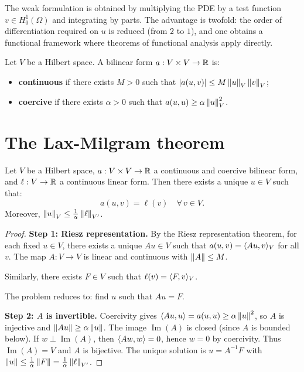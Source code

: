 \begin{intuition}
The weak formulation is obtained by multiplying the PDE by a test function
$v \in H_0^1(\Omega)$ and integrating by parts. The advantage is twofold: the
order of differentiation required on $u$ is reduced (from $2$ to $1$), and one
obtains a functional framework where theorems of functional analysis apply
directly.
\end{intuition}

\begin{definition}
Let $V$ be a Hilbert space. A bilinear form $a : V \times V \to \mathbb{R}$ is:
\begin{itemize}
    \item \textbf{continuous} if there exists $M > 0$ such that $\left| a(u,v) \right| \leq M\left\| u \right\|_V \left\| v \right\|_V$;
    \item \textbf{coercive} if there exists $\alpha > 0$ such that $a(u,u) \geq \alpha \left\| u \right\|_V^2$.
\end{itemize}
\end{definition}

\section{The Lax-Milgram theorem}

\begin{theorem}
\label{thm:lax_milgram}
Let $V$ be a Hilbert space, $a : V \times V \to \mathbb{R}$ a continuous and coercive
bilinear form, and $\ell : V \to \mathbb{R}$ a continuous linear form. Then there exists a
unique $u \in V$ such that:
\[
    a(u, v) = \ell(v) \quad \forall\, v \in V.
\]
Moreover, $\left\| u \right\|_V \leq \frac{1}{\alpha}\left\| \ell \right\|_{V'}$.
\end{theorem}

\begin{proof}
\textbf{Step 1: Riesz representation.}
By the Riesz representation theorem, for each fixed $u \in V$, there exists a
unique $Au \in V$ such that $a(u, v) = \langle Au, v \rangle_V$ for all $v$. The map
$A : V \to V$ is linear and continuous with $\left\| A \right\| \leq M$.

Similarly, there exists $F \in V$ such that $\ell(v) = \langle F, v \rangle_V$.

The problem reduces to: find $u$ such that $Au = F$.

\textbf{Step 2: $A$ is invertible.}
Coercivity gives $\langle Au, u \rangle = a(u,u) \geq \alpha\left\| u \right\|^2$, so $A$ is
injective and $\left\| Au \right\| \geq \alpha\left\| u \right\|$. The image $\operatorname{Im}(A)$
is closed (since $A$ is bounded below). If $w \perp \operatorname{Im}(A)$, then
$\langle Aw, w \rangle = 0$, hence $w = 0$ by coercivity. Thus
$\operatorname{Im}(A) = V$ and $A$ is bijective. The unique solution is
$u = A^{-1}F$ with $\left\| u \right\| \leq \frac{1}{\alpha}\left\| F \right\| = \frac{1}{\alpha}\left\| \ell \right\|_{V'}$.
\end{proof}

